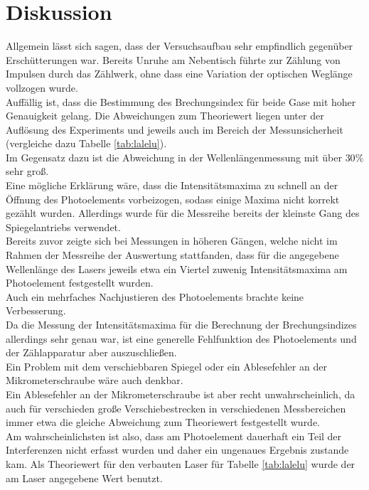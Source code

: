 \section{Diskussion}
\label{sec:Diskussion}
Allgemein lässt sich sagen, dass der Versuchsaufbau sehr empfindlich gegenüber Erschütterungen war. Bereits Unruhe am Nebentisch führte zur Zählung von Impulsen durch das Zählwerk, ohne dass eine Variation der optischen Weglänge vollzogen wurde.
\\Auffällig ist, dass die Bestimmung des Brechungsindex für beide Gase mit hoher Genauigkeit gelang. Die Abweichungen zum Theoriewert liegen unter der Auflösung des Experiments und jeweils auch im Bereich der Messunsicherheit (vergleiche dazu Tabelle \ref{tab:lalelu}).
\\Im Gegensatz dazu ist die Abweichung in der Wellenlängenmessung mit über $30\%$ sehr groß.
\\Eine mögliche Erklärung wäre, dass die Intensitätsmaxima zu schnell an der Öffnung des Photoelements vorbeizogen, sodass einige Maxima nicht korrekt gezählt wurden. Allerdings wurde für die Messreihe bereits der kleinste Gang des Spiegelantriebs verwendet.
\\Bereits zuvor zeigte sich bei Messungen in höheren Gängen, welche nicht im Rahmen der Messreihe der Auswertung stattfanden, dass für die angegebene Wellenlänge des Lasers jeweils etwa ein Viertel zuwenig Intensitätsmaxima am Photoelement festgestellt wurden. \\Auch ein mehrfaches Nachjustieren des Photoelements brachte keine Verbesserung.
\\Da die Messung der Intensitätsmaxima für die Berechnung der Brechungsindizes allerdings sehr genau war, ist eine generelle Fehlfunktion des Photoelements und der Zählapparatur aber auszuschließen. \\
Ein Problem mit dem verschiebbaren Spiegel oder ein Ablesefehler an der Mikrometerschraube wäre auch denkbar.\\
Ein Ablesefehler an der Mikrometerschraube ist aber recht unwahrscheinlich, da auch für verschieden große Verschiebestrecken in verschiedenen Messbereichen immer etwa die gleiche Abweichung zum Theoriewert festgestellt wurde.\\
Am wahrscheinlichsten ist also, dass am Photoelement dauerhaft ein Teil der Interferenzen nicht erfasst wurden und daher ein ungenaues Ergebnis zustande kam.
Als Theoriewert für den verbauten Laser für Tabelle \ref{tab:lalelu} wurde der am Laser angegebene Wert benutzt.
